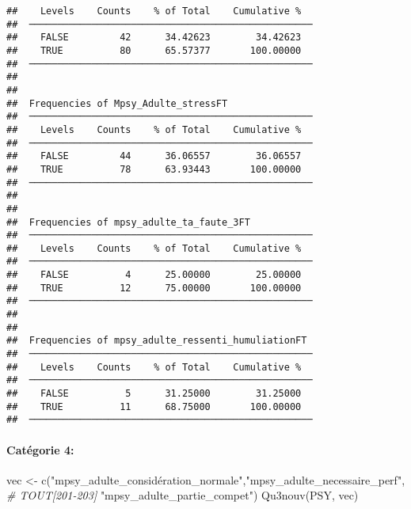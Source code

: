 \documentclass[
]{article}
\newenvironment{Shaded}{\begin{snugshade}}{\end{snugshade}}
\newcommand{\CommentTok}[1]{\textcolor[rgb]{0.56,0.35,0.01}{\textit{#1}}}
\newcommand{\FunctionTok}[1]{\textcolor[rgb]{0.00,0.00,0.00}{#1}}
\newcommand{\NormalTok}[1]{#1}
\newcommand{\OtherTok}[1]{\textcolor[rgb]{0.56,0.35,0.01}{#1}}
\newcommand{\StringTok}[1]{\textcolor[rgb]{0.31,0.60,0.02}{#1}}
\begin{document}
\begin{verbatim}
##    Levels    Counts    % of Total    Cumulative %   
##  ────────────────────────────────────────────────── 
##    FALSE         42      34.42623        34.42623   
##    TRUE          80      65.57377       100.00000   
##  ────────────────────────────────────────────────── 
## 
## 
##  Frequencies of Mpsy_Adulte_stressFT                
##  ────────────────────────────────────────────────── 
##    Levels    Counts    % of Total    Cumulative %   
##  ────────────────────────────────────────────────── 
##    FALSE         44      36.06557        36.06557   
##    TRUE          78      63.93443       100.00000   
##  ────────────────────────────────────────────────── 
## 
## 
##  Frequencies of mpsy_adulte_ta_faute_3FT            
##  ────────────────────────────────────────────────── 
##    Levels    Counts    % of Total    Cumulative %   
##  ────────────────────────────────────────────────── 
##    FALSE          4      25.00000        25.00000   
##    TRUE          12      75.00000       100.00000   
##  ────────────────────────────────────────────────── 
## 
## 
##  Frequencies of mpsy_adulte_ressenti_humuliationFT  
##  ────────────────────────────────────────────────── 
##    Levels    Counts    % of Total    Cumulative %   
##  ────────────────────────────────────────────────── 
##    FALSE          5      31.25000        31.25000   
##    TRUE          11      68.75000       100.00000   
##  ──────────────────────────────────────────────────
\end{verbatim}

\hypertarget{catuxe9gorie-4-1}{%
\paragraph{Catégorie 4:}\label{catuxe9gorie-4-1}}

\begin{Shaded}
\begin{Highlighting}[]
\NormalTok{vec }\OtherTok{\textless{}{-}} \FunctionTok{c}\NormalTok{(}\StringTok{"mpsy\_adulte\_considération\_normale"}\NormalTok{,}\StringTok{"mpsy\_adulte\_necessaire\_perf"}\NormalTok{,   }\CommentTok{\# TOUT[201{-}203]}
         \StringTok{"mpsy\_adulte\_partie\_compet"}\NormalTok{) }
\FunctionTok{Qu3nouv}\NormalTok{(PSY, vec)}
\end{Highlighting}
\end{Shaded}
\end{document}
